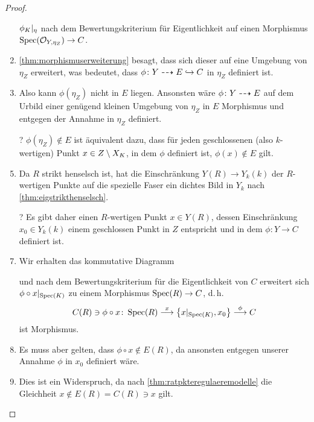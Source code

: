 \documentclass[german]{scrreprt}
\begin{document}
\begin{Lemma}
\begin{proof}
\begin{enumerate}
      $\phi_{K}|_{\eta}$ nach dem Bewertungskriterium für
      Eigentlichkeit auf einen Morphismus
      $\operatorname{Spec}(\mathcal{O}_{Y,\eta_Z})\to C$.
    \item \autoref{thm:morphismuserweiterung} besagt, dass sich
      dieser auf eine Umgebung von $\eta_Z$ erweitert, was bedeutet,
      dass $\phi\colon Y\dashrightarrow E\hookrightarrow C$ in $\eta_Z$ definiert
      ist.
    \item Also kann $\phi(\eta_Z)$ nicht in $E$ liegen. Ansonsten
      wäre $\phi\colon Y\dashrightarrow E$ auf dem Urbild einer genügend kleinen
      Umgebung von $\eta_Z$ in $E$ Morphismus und entgegen der Annahme in
      $\eta_Z$ definiert.
    \item[?] $\phi(\eta_Z)\not\in E$ ist äquivalent dazu, dass für
      jeden geschlossenen (also $k$-wertigen) Punkt $x\in Z\setminus
      X_{K}$, in dem $\phi$ definiert ist, $\phi(x)\not\in E$ gilt.
    \item Da $R$ strikt henselsch ist, hat die Einschränkung $Y(R)\to
      Y_k(k)$ der $R$-wertigen Punkte auf die spezielle Faser ein
      dichtes Bild in $Y_k$ nach \autoref{thm:eigstrikthenselsch}.
    \item[?] Es gibt daher einen $R$-wertigen Punkt $x\in Y(R)$,
      dessen Einschränkung $x_0\in Y_k(k)$ einem geschlossen Punkt in
      $Z$ entspricht und in dem $\phi\colon Y\to C$ definiert ist.
    \item Wir erhalten das kommutative Diagramm
      \begin{center}
      \end{center}
      und nach dem Bewertungskriterium für die Eigentlichkeit von $C$
      erweitert sich $\phi\circ x|_{\operatorname{Spec}(K)}$ zu einem Morphismus
      $\operatorname{Spec}(R)\to C$, d.\,h.
      \begin{gather*}
        C(R)\ni\phi\circ x\colon
        \operatorname{Spec}(R)
        \overset{x}{\longrightarrow}
        \left\{ x|_{\operatorname{Spec}(K)}, x_0 \right\}
        \overset{\phi}{\longrightarrow} C
      \end{gather*}
      ist Morphismus.
    \item Es muss aber gelten, dass $\phi\circ x\not\in E(R)$, da
      ansonsten entgegen unserer Annahme $\phi$ in $x_0$ definiert
      wäre.
    \item Dies ist ein Widerspruch, da nach
      \autoref{thm:ratpkteregulaeremodelle} die Gleichheit
      $x\not\in E(R)=C(R)\ni x$ gilt.
    \end{enumerate}
  \end{proof}
\end{Lemma}
\end{document}
